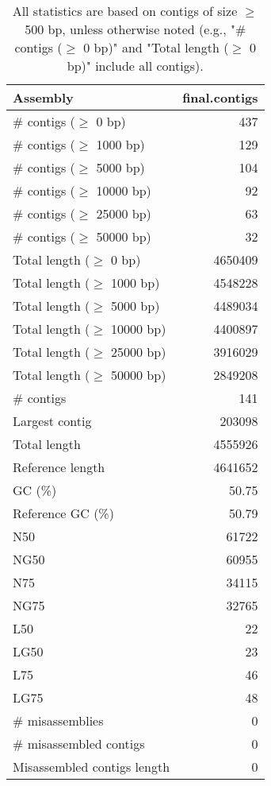 \documentclass[12pt,a4paper]{article}
\begin{document}
\begin{table}[ht]
\begin{center}
\caption{All statistics are based on contigs of size $\geq$ 500 bp, unless otherwise noted (e.g., "\# contigs ($\geq$ 0 bp)" and "Total length ($\geq$ 0 bp)" include all contigs).}
\begin{tabular}{|l*{1}{|r}|}
\hline
Assembly & final.contigs \\ \hline
\# contigs ($\geq$ 0 bp) & 437 \\ \hline
\# contigs ($\geq$ 1000 bp) & 129 \\ \hline
\# contigs ($\geq$ 5000 bp) & 104 \\ \hline
\# contigs ($\geq$ 10000 bp) & 92 \\ \hline
\# contigs ($\geq$ 25000 bp) & 63 \\ \hline
\# contigs ($\geq$ 50000 bp) & 32 \\ \hline
Total length ($\geq$ 0 bp) & 4650409 \\ \hline
Total length ($\geq$ 1000 bp) & 4548228 \\ \hline
Total length ($\geq$ 5000 bp) & 4489034 \\ \hline
Total length ($\geq$ 10000 bp) & 4400897 \\ \hline
Total length ($\geq$ 25000 bp) & 3916029 \\ \hline
Total length ($\geq$ 50000 bp) & 2849208 \\ \hline
\# contigs & 141 \\ \hline
Largest contig & 203098 \\ \hline
Total length & 4555926 \\ \hline
Reference length & 4641652 \\ \hline
GC (\%) & 50.75 \\ \hline
Reference GC (\%) & 50.79 \\ \hline
N50 & 61722 \\ \hline
NG50 & 60955 \\ \hline
N75 & 34115 \\ \hline
NG75 & 32765 \\ \hline
L50 & 22 \\ \hline
LG50 & 23 \\ \hline
L75 & 46 \\ \hline
LG75 & 48 \\ \hline
\# misassemblies & 0 \\ \hline
\# misassembled contigs & 0 \\ \hline
Misassembled contigs length & 0 \\ \hline

\end{tabular}
\end{center}
\end{table}
\end{document}
